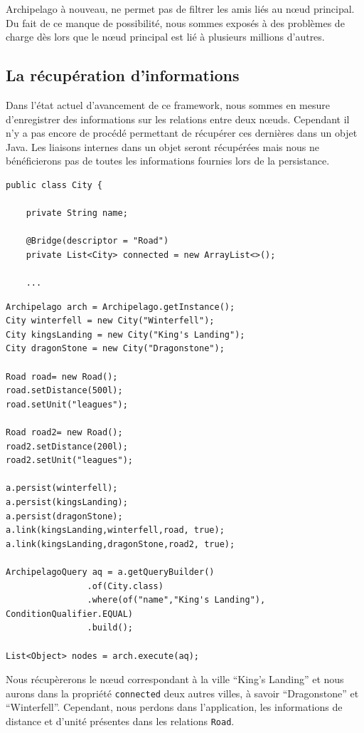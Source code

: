 \documentclass[a4paper,fleqn,12pt,oneside]{report}
\begin{document}
Archipelago à nouveau, ne permet pas de filtrer les amis liés au nœud principal. Du fait de ce manque de possibilité, nous sommes exposés à des problèmes de charge dès lors que le nœud principal est lié à plusieurs millions d'autres.

\subsection{La récupération d'informations}

Dans l'état actuel d'avancement de ce framework, nous sommes en mesure d'enregistrer des informations sur les relations entre deux nœuds. Cependant il n'y a pas encore de procédé permettant de récupérer ces dernières dans un objet Java. Les  liaisons internes dans un objet seront récupérées mais nous ne bénéficierons pas de toutes les informations fournies lors de la persistance.

\begin{lstlisting}
public class City {

    private String name;

    @Bridge(descriptor = "Road")
    private List<City> connected = new ArrayList<>();
	
	...
\end{lstlisting}

\begin{lstlisting}
Archipelago arch = Archipelago.getInstance();
City winterfell = new City("Winterfell");
City kingsLanding = new City("King's Landing");
City dragonStone = new City("Dragonstone");

Road road= new Road();
road.setDistance(500l);
road.setUnit("leagues");

Road road2= new Road();
road2.setDistance(200l);
road2.setUnit("leagues");

a.persist(winterfell);
a.persist(kingsLanding);
a.persist(dragonStone);
a.link(kingsLanding,winterfell,road, true);
a.link(kingsLanding,dragonStone,road2, true);

ArchipelagoQuery aq = a.getQueryBuilder()
                .of(City.class)
                .where(of("name","King's Landing"), ConditionQualifier.EQUAL)
                .build();
                
List<Object> nodes = arch.execute(aq);
\end{lstlisting}
\newpage
Nous récupèrerons le nœud correspondant à la ville \enquote{King's Landing} et nous aurons dans la propriété \texttt{connected} deux autres villes, à savoir \enquote{Dragonstone} et \enquote{Winterfell}. Cependant, nous perdons dans l'application, les informations de distance et d'unité présentes dans les relations \texttt{Road}.
\end{document}
